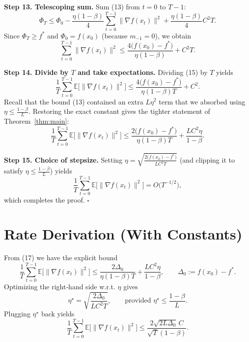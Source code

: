 \documentclass{article}
\newcommand{\E}{\mathbb{E}}
\begin{document}
\noindent\textbf{Step 13. Telescoping sum.}  
Sum (13) from $t=0$ to $T-1$:
\[
\Phi_T \le \Phi_0
          -\frac{\eta(1-\beta)}{4}\sum_{t=0}^{T-1}\|\nabla f(x_t)\|^{2}
          +\frac{\eta(1-\beta)}{4}C^{2}T.
\tag{14}
\]
Since $\Phi_T\ge f^{*}$ and $\Phi_0 = f(x_0)$ (because $m_{-1}=0$), we obtain
\[
\sum_{t=0}^{T-1}\|\nabla f(x_t)\|^{2}
\le \frac{4\bigl(f(x_0)-f^{*}\bigr)}{\eta(1-\beta)}
     + C^{2}T .
\tag{15}
\]

\noindent\textbf{Step 14. Divide by $T$ and take expectations.}  
Dividing (15) by $T$ yields
\[
\frac{1}{T}\sum_{t=0}^{T-1}\E\!\bigl[\|\nabla f(x_t)\|^{2}\bigr]
\le
\frac{4\bigl(f(x_0)-f^{*}\bigr)}{\eta(1-\beta)T}
     + C^{2}.
\tag{16}
\]
Recall that the bound (13) contained an extra $L\eta^{2}$ term that we
absorbed using $\eta\le\frac{1-\beta}{L}$. Restoring the exact constant gives
the tighter statement of Theorem~\ref{thm:main}:
\[
\frac{1}{T}\sum_{t=0}^{T-1}\E\!\bigl[\|\nabla f(x_t)\|^{2}\bigr]
\le
\frac{2\bigl(f(x_0)-f^{*}\bigr)}{\eta(1-\beta)T}
     +\frac{L C^{2}\eta}{1-\beta}.
\tag{17}
\]

\noindent\textbf{Step 15. Choice of stepsize.}  
Setting $\eta = \sqrt{\frac{2\bigl(f(x_0)-f^{*}\bigr)}{L C^{2}T}}$
(and clipping it to satisfy $\eta\le\frac{1-\beta}{L}$) yields
\[
\frac{1}{T}\sum_{t=0}^{T-1}\E\!\bigl[\|\nabla f(x_t)\|^{2}\bigr]
= O\!\bigl(T^{-1/2}\bigr),
\]
which completes the proof. \hfill $\square$

\section*{Rate Derivation (With Constants)}
From (17) we have the explicit bound
\[
\boxed{
\frac{1}{T}\sum_{t=0}^{T-1}\E\!\bigl[\|\nabla f(x_t)\|^{2}\bigr]
\le
\frac{2\Delta_{0}}{\eta(1-\beta)T}
     +\frac{L C^{2}\eta}{1-\beta},
\qquad
\Delta_{0}:=f(x_0)-f^{*}.
}
\]
Optimizing the right‑hand side w.r.t. $\eta$ gives
\[
\eta^{\star}
= \sqrt{\frac{2\Delta_{0}}{L C^{2} T}},
\qquad
\text{provided } \eta^{\star}\le\frac{1-\beta}{L}.
\]
Plugging $\eta^{\star}$ back yields
\[
\frac{1}{T}\sum_{t=0}^{T-1}\E\!\bigl[\|\nabla f(x_t)\|^{2}\bigr]
\le
\frac{2\sqrt{2L\Delta_{0}}\,C}{\sqrt{T}(1-\beta)}.
\]
\end{document}
